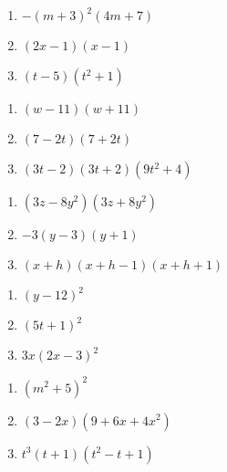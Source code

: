 \documentclass{ximera}
\begin{document}
\begin{multicols}{3}
\begin{enumerate}
\setcounter{enumi}{\value{HW}}

\item $-(m+3)^2(4m+7)$
\item $(2x-1)(x-1)$
\item $(t-5)(t^2+1)$

\setcounter{HW}{\value{enumi}}
\end{enumerate}
\end{multicols}

\begin{multicols}{3}
\begin{enumerate}
\setcounter{enumi}{\value{HW}}

\item $(w-11)(w+11)$
\item $(7-2t)(7+2t)$
\item $(3t-2)(3t+2)(9t^2+4)$

\setcounter{HW}{\value{enumi}}
\end{enumerate}
\end{multicols}

\begin{multicols}{3}
\begin{enumerate}
\setcounter{enumi}{\value{HW}}

\item $(3z-8y^2)(3z+8y^2)$
\item $-3(y - 3)(y+1)$
\item $(x+h)(x+h-1)(x+h+1)$

\setcounter{HW}{\value{enumi}}
\end{enumerate}
\end{multicols}

\begin{multicols}{3}
\begin{enumerate}
\setcounter{enumi}{\value{HW}}

\item $(y-12)^2$
\item $(5t+1)^2$
\item $3x(2x-3)^2$

\setcounter{HW}{\value{enumi}}
\end{enumerate}
\end{multicols}

\begin{multicols}{3}
\begin{enumerate}
\setcounter{enumi}{\value{HW}}

\item $(m^2+5)^2$
\item $(3-2x)(9 + 6x + 4x^2)$
\item $t^3(t+1)(t^2 - t + 1)$


\setcounter{HW}{\value{enumi}}
\end{enumerate}
\end{multicols}
\end{document}
